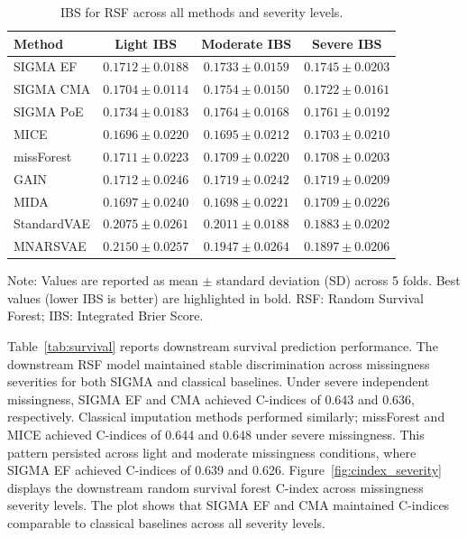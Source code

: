 \documentclass[final,3p,times,authoryear]{elsarticle}
\begin{document}
\begin{table}[!t]
\centering
{}
\caption{IBS for RSF across all methods and severity levels.}
\label{tab:survival_ibs}
\begin{tabular}{lccc}
\toprule
Method & Light IBS & Moderate IBS & Severe IBS \\
\midrule
SIGMA EF & $0.1712 \pm 0.0188$ & $0.1733 \pm 0.0159$ & $0.1745 \pm 0.0203$ \\
SIGMA CMA & $0.1704 \pm 0.0114$ & $0.1754 \pm 0.0150$ & $0.1722 \pm 0.0161$ \\
SIGMA PoE & $0.1734 \pm 0.0183$ & $0.1764 \pm 0.0168$ & $0.1761 \pm 0.0192$ \\
MICE & $\mathbf{0.1696 \pm 0.0220}$ & $\mathbf{0.1695 \pm 0.0212}$ & $0.1703 \pm 0.0210$ \\
missForest & $0.1711 \pm 0.0223$ & $0.1709 \pm 0.0220$ & $0.1708 \pm 0.0203$ \\
GAIN & $0.1712 \pm 0.0246$ & $0.1719 \pm 0.0242$ & $0.1719 \pm 0.0209$ \\
MIDA & $0.1697 \pm 0.0240$ & $0.1698 \pm 0.0221$ & $0.1709 \pm 0.0226$ \\
StandardVAE & $0.2075 \pm 0.0261$ & $0.2011 \pm 0.0188$ & $0.1883 \pm 0.0202$ \\
MNARSVAE & $0.2150 \pm 0.0257$ & $0.1947 \pm 0.0264$ & $0.1897 \pm 0.0206$ \\
\bottomrule
\end{tabular}

\vspace{1ex}
\footnotesize{Note: Values are reported as mean $\pm$ standard deviation (SD) across 5 folds. Best values (lower IBS is better) are highlighted in bold. RSF: Random Survival Forest; IBS: Integrated Brier Score.}
\end{table}

Table~\ref{tab:survival} reports downstream survival prediction performance. The downstream RSF model maintained stable discrimination across missingness severities for both SIGMA and classical baselines. Under severe independent missingness, SIGMA EF and CMA achieved C-indices of 0.643 and 0.636, respectively. Classical imputation methods performed similarly; missForest and MICE achieved C-indices of 0.644 and 0.648 under severe missingness. This pattern persisted across light and moderate missingness conditions, where SIGMA EF achieved C-indices of 0.639 and 0.626. Figure~\ref{fig:cindex_severity} displays the downstream random survival forest C-index across missingness severity levels. The plot shows that SIGMA EF and CMA maintained C-indices comparable to classical baselines across all severity levels.
\end{document}
